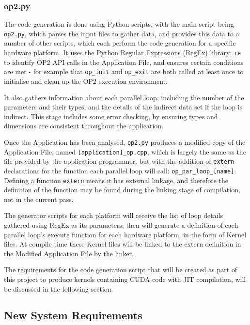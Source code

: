 \subsubsection{op2.py}
\label{ss:impl_op2}
The code generation is done using Python scripts, with the main script being \verb|op2.py|, which parses the input files to gather data, and provides this data to a number of other scripts, which each perform the code generation for a specific hardware platform. It uses the Python Regular Expressions (RegEx) library: \verb|re| \cite{re} to identify OP2 API calls in the Application File, and ensures certain conditions are met - for example that \verb|op_init| and \verb|op_exit| are both called at least once to initialise and clean up the OP2 execution environment.
\par
It also gathers information about each parallel loop, including the number of the parameters and their types, and the details of the indirect data set if the loop is indirect. This stage includes some error checking, by ensuring types and dimensions are consistent throughout the application.
\par
Once the Application has been analysed, \verb|op2.py| produces a modified copy of the Application File, named \verb|[application]_op.cpp|, which is largely the same as the file provided by the application programmer, but with the addition of \verb|extern| declarations for the function each parallel loop will call: \verb|op_par_loop_[name]|. Defining a function \verb|extern| means it has external linkage, and therefore the definition of the function may be found during the linking stage of compilation, not in the current pass.
\par
The generator scripts for each platform will receive the list of loop details gathered using RegEx as its parameters, then will generate a definition of each parallel loop's execute function for each hardware platform, in the form of Kernel files. At compile time these Kernel files will be linked to the extern definition in the Modified Application File by the linker.
\par
The requirements for the code generation script that will be created as part of this project to produce kernels containing CUDA code with JIT compilation, will be discussed in the following section.

\subsection{New System Requirements}
\label{ss:reqs}

